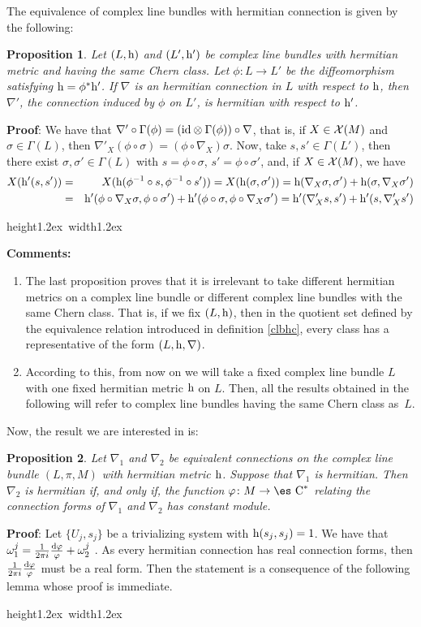 \documentclass[12pt]{article}
\newtheorem{prop}{Proposition}
\def\beann{\begin{eqnarray*}}
\def\eeann{\end{eqnarray*}}
\def\dst{\(}
\def\qed{\ifvmode\removelastskip\fi
{\unskip\nobreak\hfil\penalty50\hbox{}\nobreak\hfil
\hbox{\vrule height1.2ex width1.2ex}\parfillskip=0pt
\finalhyphendemerits=0 \par\smallskip}}
\def\d{{\rm d}}
\def\h{{\rm h}}
\def\Complex{\mbox{\es C}}
\begin{document}
The equivalence of complex line bundles with
hermitian connection is given by the following:

\begin{prop}
Let $(L,\h )$ and $(L',\h ')$ be complex line bundles
with hermitian metric and having the same Chern class.
Let $\phi \colon L \to L'$ be the diffeomorphism
satisfying $\h = \phi^*\h '$.
If $\nabla$ is an hermitian connection in $L$ with
respect to $\h$, then $\nabla '$,
the connection induced by $\phi$ on $L'$,
is hermitian with respect to $\h '$.
\label{llprim}
\end{prop}
{\bf Proof}: 
We have that
$\nabla ' \circ \Gamma (\phi ) =
({\rm id} \otimes \Gamma (\phi )) \circ \nabla$,
that is, if $X \in {\cal X}(M)$ and
$\sigma \in \Gamma (L)$, then
$\nabla '_X (\phi \circ \sigma ) = (\phi \circ \nabla_X)\sigma$.
Now, take $s,s' \in \Gamma (L')$,
then there exist $\sigma ,\sigma ' \in \Gamma (L)$
with $s = \phi \circ \sigma$,
$s' = \phi \circ \sigma '$,
and, if $X \in {\cal X}(M)$, we have
\beann
X(\h '(s,s'))
&=&
X(\h (\phi^{-1} \circ s,\phi^{-1} \circ s')) =
X(\h (\sigma ,\sigma '))=
\h (\nabla_X \sigma ,\sigma ') + \h (\sigma ,\nabla_X \sigma ')
\\
&=&
\h '(\phi \circ \nabla_X \sigma ,\phi \circ \sigma ') +
\h '(\phi \circ \sigma ,\phi \circ \nabla_X \sigma ')=
\h '(\nabla '_X s,s') + \h '(s,\nabla '_X s')
\eeann
\qed

{\bf Comments:}
\begin{enumerate}
\item
The last proposition proves that it is irrelevant
to take different hermitian metrics on a complex line bundle
or different complex line bundles with the same Chern class.
That is, if we fix $(L,\h )$, then in the quotient set
defined by the equivalence relation introduced in definition
\ref{clbhc},
every class has a representative of the form
$(L,\h ,\nabla )$.
\item
According to this, from now on we will take
a fixed complex line bundle $L$ with one fixed
hermitian metric $\h$ on $L$.
Then, all the results obtained in the following will refer to
complex line bundles having the same Chern class as~$L$.
\end{enumerate}

Now, the result we are interested in is:

\begin{prop}
Let $\nabla_1$ and $\nabla_2$ be equivalent connections on the
complex line bundle $(L,\pi ,M)$ with hermitian metric $\h$.
Suppose that $\nabla _1$ is hermitian. Then $\nabla_2$ is
hermitian if, and only if, the function $\varphi \colon M \to
\Complex^*$ relating the connection forms of $\nabla_1$ and
$\nabla_2$ has constant module. \label{ll}
\end{prop}
{\bf Proof}: 
Let $\{ U_j,s_j \}$ be  a trivializing system
with $\h (s_j,s_j) = 1$.
We have that
\dst \omega^j_1 = \frac{1}{2\pi i}\frac{\d \varphi}{\varphi} +
\omega^j_2\) .
As every hermitian connection has real connection forms,
then \dst\frac{1}{2\pi i}\frac{\d \varphi}{\varphi}\)
must be a real form.
Then the statement is a consequence of the following lemma
whose proof is immediate.
\qed
\end{document}
